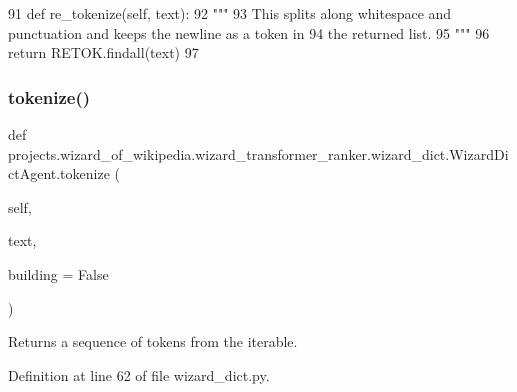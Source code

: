 \begin{DoxyCode}
91     \textcolor{keyword}{def }re\_tokenize(self, text):
92         \textcolor{stringliteral}{"""}
93 \textcolor{stringliteral}{        This splits along whitespace and punctuation and keeps the newline as a token in}
94 \textcolor{stringliteral}{        the returned list.}
95 \textcolor{stringliteral}{        """}
96         \textcolor{keywordflow}{return} RETOK.findall(text)
97 \end{DoxyCode}
\mbox{\label{classprojects_1_1wizard__of__wikipedia_1_1wizard__transformer__ranker_1_1wizard__dict_1_1WizardDictAgent_a314852ee65380b494e078d51d73c0767}} 
\subsubsection{\texorpdfstring{tokenize()}{tokenize()}}
{\footnotesize\ttfamily def projects.\+wizard\+\_\+of\+\_\+wikipedia.\+wizard\+\_\+transformer\+\_\+ranker.\+wizard\+\_\+dict.\+Wizard\+Dict\+Agent.\+tokenize (\begin{DoxyParamCaption}\item[{}]{self,  }\item[{}]{text,  }\item[{}]{building = {\ttfamily False} }\end{DoxyParamCaption})}

\begin{DoxyVerb}Returns a sequence of tokens from the iterable.
\end{DoxyVerb}
 

Definition at line 62 of file wizard\+\_\+dict.\+py.


